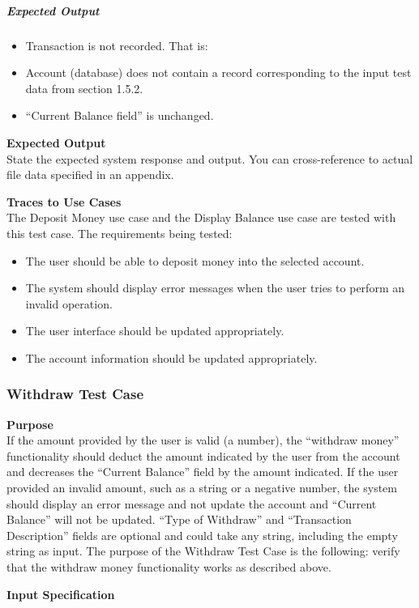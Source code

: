 \documentclass[12pt]{article}
\begin{document}
\subparagraph{Expected Output}
\begin{itemize}
  \item Transaction is not recorded. That is:
  \item Account (database) does not contain a record corresponding to the input test data from section 1.5.2.
  \item ``Current Balance field'' is unchanged.
\end{itemize}

\noindent
{\bf Expected Output}\\
State the expected system response and output.
You can cross-reference to actual file data specified in an appendix.

\noindent
{\bf Traces to Use Cases}\\
The Deposit Money use case and the Display Balance use case are tested with this test case. The requirements being tested:
\begin{itemize}
  \item The user should be able to deposit money into the selected account.
  \item The system should display error messages when the user tries to perform an invalid operation.
  \item The user interface should be updated appropriately.
  \item The account information should be updated appropriately.
\end{itemize}

\subsubsection{Withdraw Test Case} \label{tc:2}

\noindent
{\bf Purpose}\\
If the amount provided by the user is valid (a number), the ``withdraw money'' functionality should deduct the amount indicated by the user from the account and decreases the ``Current Balance'' field by the amount indicated. If the user provided an invalid amount, such as a string or a negative number, the system should display an error message and not update the account and ``Current Balance'' will not be updated. ``Type of Withdraw'' and ``Transaction Description'' fields are optional and could take any string, including the empty string as input. The purpose of the Withdraw Test Case is the following: verify that the withdraw money functionality works as described above.

\noindent
{\bf Input Specification}
\end{document}
